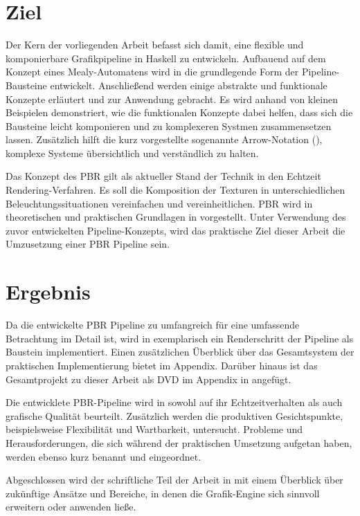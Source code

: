 \section{Ziel}

Der Kern der vorliegenden Arbeit befasst sich damit, eine flexible und komponierbare Grafikpipeline in Haskell zu entwickeln. Aufbauend auf dem Konzept eines Mealy-Automatens wird in  die grundlegende Form der Pipeline-Bausteine entwickelt. Anschließend werden einige abstrakte und funktionale Konzepte erläutert und zur Anwendung gebracht. Es wird anhand von kleinen Beispielen demonstriert, wie die funktionalen Konzepte dabei helfen, dass sich die Bausteine leicht komponieren und zu komplexeren Systmen zusammensetzen lassen. Zusätzlich hilft die kurz vorgestellte sogenannte Arrow-Notation (), komplexe Systeme übersichtlich und verständlich zu halten.

Das Konzept des \acl{PBR} gilt als aktueller Stand der Technik in den Echtzeit Rendering-Verfahren. Es soll die Komposition der Texturen in unterschiedlichen Beleuchtungssituationen vereinfachen und vereinheitlichen. \ac{PBR} wird in theoretischen und praktischen Grundlagen in  vorgestellt. Unter Verwendung des zuvor entwickelten Pipeline-Konzepts, wird das praktische Ziel dieser Arbeit die Umzusetzung einer \ac{PBR} Pipeline sein.

\section{Ergebnis}
Da die entwickelte \ac{PBR} Pipeline zu umfangreich für eine umfassende Betrachtung im Detail ist, wird in  exemplarisch ein Renderschritt der Pipeline als Baustein implementiert. Einen zusätzlichen Überblick über das Gesamtsystem der praktischen Implementierung bietet  im Appendix. Darüber hinaus ist das Gesamtprojekt zu dieser Arbeit als DVD im Appendix in  angefügt.

Die entwicklete \ac{PBR}-Pipeline wird in  sowohl auf ihr Echtzeitverhalten als auch grafische Qualität beurteilt. Zusätzlich werden die produktiven Gesichtspunkte, beispielsweise Flexibilität und Wartbarkeit, untersucht. Probleme und Herausforderungen, die sich während der praktischen Umsetzung aufgetan haben, werden ebenso kurz benannt und eingeordnet.

Abgeschlossen wird der schriftliche Teil der Arbeit in  mit einem Überblick über zukünftige Ansätze und Bereiche, in denen die Grafik-Engine sich sinnvoll erweitern oder anwenden ließe.

